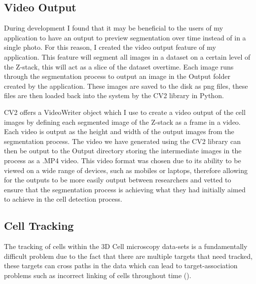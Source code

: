 \documentclass[12pt a4paper]{article}
\begin{document}
\subsection{Video Output}
During development I found that it may be beneficial to the users of my application to have an output to preview segmentation over time instead of in a single photo.
For this reason, I created the video output feature of my application. This feature will segment all images in a dataset on a certain level of the Z-stack, this will act as a slice of the dataset overtime. Each image runs through the segmentation process to output an image in the Output folder created by the application.
These images are saved to the disk as png files, these files are then loaded back into the system by the CV2 library in Python.

CV2 offers a VideoWriter object which I use to create a video output of the cell images by defining each segmented image of the Z-stack as a frame in a video. Each video is output as the height and width of the output images from the segmentation process.
The video we have generated using the CV2 library can then be output to the Output directory storing the intermediate images in the process as a .MP4 video. This video format was chosen due to its ability to be viewed on a wide range of devices, such as mobiles or laptops, therefore allowing for the outputs to be more easily output between researchers and vetted to ensure that the segmentation process is achieving what they had initially aimed to achieve in the cell detection process.
\subsection{Cell Tracking}
The tracking of cells within the 3D Cell microscopy data-sets is a fundamentally difficult problem due to the fact that there are multiple targets that need tracked, these targets can cross paths in the data which can lead to target-association problems such as incorrect linking of cells throughout time (\cite{li2002detection}).
\end{document}
